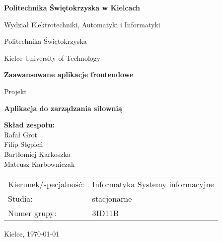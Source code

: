 \documentclass[../../spr.tex]{subfiles}
\begin{document}
\begin{titlepage}
  \centering

  {\fontsize{16}{18}\selectfont \bfseries Politechnika Świętokrzyska w Kielcach}

  \vspace{0.5cm}
  Wydział Elektrotechniki, Automatyki i Informatyki

  \vspace{1.5cm}
  {\large Politechnika Świętokrzyska}

  \vspace{0.2cm}
  {\large Kielce University of Technology}

  \vfill

  {\LARGE \bfseries Zaawansowane aplikacje frontendowe}

  \vspace{1.5cm}
  {\Huge Projekt}

  \vfill

  {\Huge \bfseries Aplikacja do zarządzania siłownią}

  \vfill

  \begin{flushleft}
    \begin{minipage}{0.5\textwidth}
      \large
      \textbf{Skład zespołu:} \\
      Rafał Grot \\
      Filip Stępień \\
      Bartłomiej Karkoszka \\
      Mateusz Karbowniczak
    \end{minipage}

    \vspace{2cm}

    \begin{minipage}{0.8\textwidth}
      \large
      \begin{tabular}{p{5cm}p{8cm}}
        Kierunek/specjalność: & Informatyka Systemy informacyjne \\
        Studia:               & stacjonarne                      \\
        Numer grupy:          & 3ID11B
      \end{tabular}
    \end{minipage}
  \end{flushleft}

  \vspace{1cm}

  \large Kielce, \today
\end{titlepage}
\end{document}
